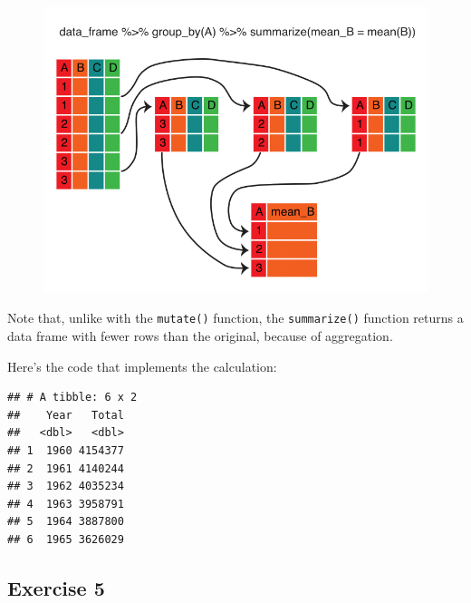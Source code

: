 \documentclass[]{book}
\newenvironment{Shaded}{\begin{snugshade}}{\end{snugshade}}
\newcommand{\KeywordTok}[1]{\textcolor[rgb]{0.13,0.29,0.53}{\textbf{#1}}}
\newcommand{\DataTypeTok}[1]{\textcolor[rgb]{0.13,0.29,0.53}{#1}}
\newcommand{\StringTok}[1]{\textcolor[rgb]{0.31,0.60,0.02}{#1}}
\newcommand{\OperatorTok}[1]{\textcolor[rgb]{0.81,0.36,0.00}{\textbf{#1}}}
\newcommand{\NormalTok}[1]{#1}
\begin{document}
\begin{figure}
\centering
\includegraphics{R/Rintro/images/summarize_group_by.png}
\caption{}
\end{figure}

Note that, unlike with the \texttt{mutate()} function, the
\texttt{summarize()} function returns a data frame with fewer rows than
the original, because of aggregation.

Here's the code that implements the calculation:

\begin{Shaded}
\end{Shaded}

\begin{verbatim}
## # A tibble: 6 x 2
##    Year   Total
##   <dbl>   <dbl>
## 1  1960 4154377
## 2  1961 4140244
## 3  1962 4035234
## 4  1963 3958791
## 5  1964 3887800
## 6  1965 3626029
\end{verbatim}

\subsection{Exercise 5}\label{exercise-5}
\end{document}
